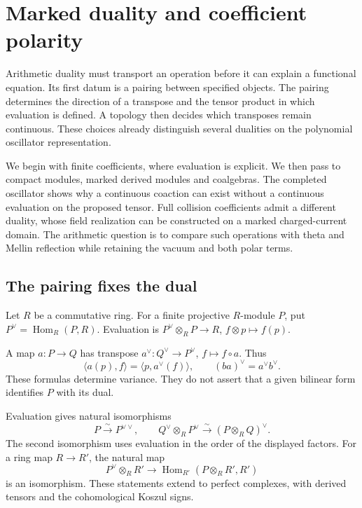 \chapter{Marked duality and coefficient polarity}
\label{v4-arith:md:chapter}

Arithmetic duality must transport an operation before it can explain a
functional equation. Its first datum is a pairing between specified
objects. The pairing determines the direction of a transpose and the
tensor product in which evaluation is defined. A topology then decides
which transposes remain continuous. These choices already distinguish
several dualities on the polynomial oscillator representation.

We begin with finite coefficients, where evaluation is explicit. We
then pass to compact modules, marked derived modules and coalgebras.
The completed oscillator shows why a continuous coaction can exist
without a continuous evaluation on the proposed tensor. Full collision
coefficients admit a different duality, whose field realization can be
constructed on a marked charged-current domain. The arithmetic question
is to compare such operations with theta and Mellin reflection while
retaining the vacuum and both polar terms.

\section{The pairing fixes the dual}
\label{v4-arith:md:sec:finite}

Let $R$ be a commutative ring. For a finite projective $R$-module $P$,
put $P^\vee=\operatorname{Hom}_R(P,R)$. Evaluation is
$P^\vee\otimes_RP\to R$, $f\otimes p\mapsto f(p)$.

A map $a:P\to Q$ has transpose
$a^\vee:Q^\vee\to P^\vee$, $f\mapsto f\circ a$. Thus
\begin{equation}\label{v4-arith:md:eq:transpose}
 \langle a(p),f\rangle=\langle p,a^\vee(f)\rangle,
 \qquad (ba)^\vee=a^\vee b^\vee.
\end{equation}
These formulas determine variance. They do not assert that a given
bilinear form identifies $P$ with its dual.

\begin{proposition}
\label{v4-arith:md:prop:finite}
Evaluation gives natural isomorphisms
\[
 P\xrightarrow{\sim}P^{\vee\vee},\qquad
 Q^\vee\otimes_RP^\vee\xrightarrow{\sim}(P\otimes_RQ)^\vee.
\]
The second isomorphism uses evaluation in the order of the displayed
factors. For a ring map $R\to R'$, the natural map
\[
 P^\vee\otimes_RR'\longrightarrow
 \operatorname{Hom}_{R'}(P\otimes_RR',R')
\]
is an isomorphism. These statements extend to perfect complexes, with
derived tensors and the cohomological Koszul signs.
\end{proposition}

